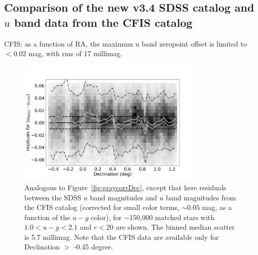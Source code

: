 \subsection{Comparison of the new v3.4 SDSS catalog and $u$ band data from the CFIS catalog  \label{sec:CFIStest}} 


CFIS: as a function of RA, the maximum u band zeropoint offset is limited to $<0.02$ mag,
           with rms of 17 millimag. 


\begin{figure}
    \centering\includegraphics[width=9cm]{figures/colorResidCFISug_Dec_Hess.png} 
\caption{Analogous to Figure~\ref{fig:graycorrDec}, except that here residuals 
between the SDSS $u$ band magnitudes and $u$ band magnitudes from the CFIS
catalog (corrected for small color terms, $\sim0.05$ mag, as a function of the $u-g$ color),
for $\sim$150,000 matched stars with $1.0 <u-g < 2.1$ and $r<20$ are shown. 
The binned median scatter is 5.7 millimag. Note that the CFIS data are available
only for Declination $>$ -0.45 degree.}
\label{fig:CFIS}
\end{figure}

 